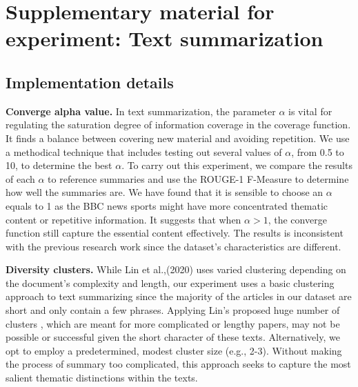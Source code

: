 \newpage
\section{Supplementary material for experiment: Text summarization} \label{appendix:supp-material-application3}


\subsection{Implementation details} \label{appendix:experiment3-implementation-details}

\textbf{Converge alpha value.}
In text summarization, the parameter $\alpha$ is vital for regulating the saturation degree of information coverage in the coverage function. It finds a balance between covering new material and avoiding repetition. We use a methodical technique that includes testing out several values of $\alpha$, from 0.5 to 10, to determine the best $\alpha$. To carry out this experiment, we compare the results of each $\alpha$ to reference summaries and use the ROUGE-1 F-Measure to determine how well the summaries are. We have found that it is sensible to choose an $\alpha$ equals to 1 as the BBC news sports might have more concentrated thematic content or repetitive information. It suggests that when $\alpha>1$, the converge function still capture the essential content effectively. The results is inconsistent with the previous research work \cite{lin2011class} since the dataset's characteristics are different. 


\textbf{Diversity clusters.}
While Lin et al.,(2020) \cite{lin2011class} uses varied clustering depending on the document's complexity and length, our experiment uses a basic clustering approach to text summarizing since the majority of the articles in our dataset are short and only contain a few phrases. Applying Lin's proposed huge number of clusters \cite{lin2011class}, which are meant for more complicated or lengthy papers, may not be possible or successful given the short character of these texts. Alternatively, we opt to employ a predetermined, modest cluster size (e.g., 2-3). Without making the process of summary too complicated, this approach seeks to capture the most salient thematic distinctions within the texts. 




